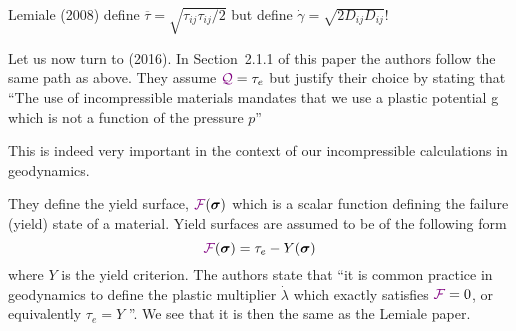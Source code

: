 \begin{remark}
Lemiale \etal (2008) define $\overline{\tau}=\sqrt{\tau_{ij}\tau_{ij}/2}$
but define $\dot{\gamma}=\sqrt{2 D_{ij}D_{ij}}$!
\end{remark}

Let us now turn to \textcite{spmw16} (2016).
In Section~2.1.1 of this paper the authors follow the same path as above. 
They assume ${\color{violet}\cal Q}=\tau_e$ but justify their choice by stating that 
``The use of incompressible materials mandates that we use a plastic potential g which is not a function of the pressure $p$''

This is indeed very important in the context of our incompressible calculations in geodynamics. 

They define the yield surface, ${\color{violet}\cal F}(\bm\sigma)$ which is a scalar function defining the failure (yield) state of a material. Yield surfaces are
assumed to be of the following form 
\[
{\color{violet}\cal F}(\bm\sigma) =\tau_e - Y(\bm\sigma)
\]
where $Y$ is the yield criterion.
The authors state that ``it is common practice in geodynamics to define the
plastic multiplier $\dot\lambda$ which exactly satisfies ${\color{violet}\cal F}=0$, 
or equivalently $\tau_e=Y$ \cite{lemm08}''.
We see that it is then the same as the Lemiale \etal paper.



